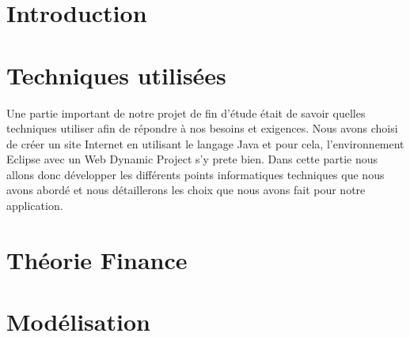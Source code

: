 \documentclass{report}
\begin{document}
\setcounter{page}{1}
\tableofcontents{}
\chapter{Introduction}
	

\chapter{Techniques utilisées}
Une partie important de notre projet de fin d'étude était de savoir quelles techniques utiliser afin de répondre à nos besoins et exigences. Nous avons choisi de créer un site Internet en utilisant le langage Java et pour cela, l'environnement Eclipse avec un Web Dynamic Project s'y prete bien.
Dans cette partie nous allons donc développer les différents points informatiques techniques que nous avons abordé et nous détaillerons les choix que nous avons fait pour notre application.
	
	
	
	
	
	
	
	
	
	
	
	
	

	
	
\chapter{Théorie Finance}
	
	
	
	
	
	
	
	
	
\chapter{Modélisation}
	
	
	
	
	
	
	
	
\end{document}
